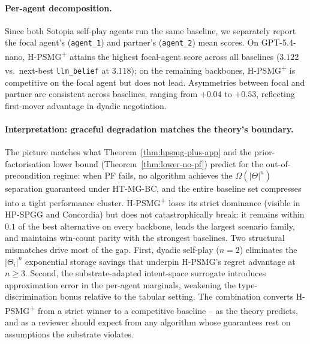 \paragraph{Per-agent decomposition.} Since both Sotopia self-play agents run the same baseline, we separately report the focal agent's (\texttt{agent\_1}) and partner's (\texttt{agent\_2}) mean scores. On GPT-5.4-nano, H-PSMG\textsuperscript{+} attains the highest focal-agent score across all baselines ($3.122$ vs.\ next-best \texttt{llm\_belief} at $3.118$); on the remaining backbones, H-PSMG\textsuperscript{+} is competitive on the focal agent but does not lead. Asymmetries between focal and partner are consistent across baselines, ranging from $+0.04$ to $+0.53$, reflecting first-mover advantage in dyadic negotiation.

\paragraph{Interpretation: graceful degradation matches the theory's boundary.} The picture matches what Theorem~\ref{thm:hpsmg-plus-app} and the prior-factorisation lower bound (Theorem~\ref{thm:lower-no-pf}) predict for the out-of-precondition regime: when PF fails, no algorithm achieves the $\Omega(|\Theta|^n)$ separation guaranteed under HT-MG-BC, and the entire baseline set compresses into a tight performance cluster. H-PSMG\textsuperscript{+} loses its strict dominance (visible in HP-SPGG and Concordia) but does not catastrophically break: it remains within $0.1$ of the best alternative on every backbone, leads the largest scenario family, and maintains win-count parity with the strongest baselines. Two structural mismatches drive most of the gap. First, dyadic self-play ($n{=}2$) eliminates the $|\Theta_i|^n$ exponential storage savings that underpin H-PSMG's regret advantage at $n\!\geq\!3$. Second, the substrate-adapted intent-space surrogate introduces approximation error in the per-agent marginals, weakening the type-discrimination bonus relative to the tabular setting. The combination converts H-PSMG\textsuperscript{+} from a strict winner to a competitive baseline -- as the theory predicts, and as a reviewer should expect from any algorithm whose guarantees rest on assumptions the substrate violates.

